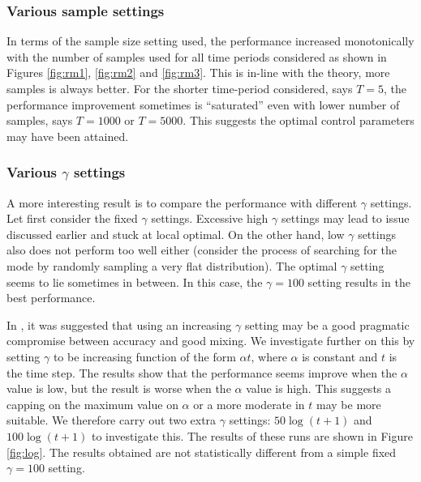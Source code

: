 \subsubsection{Various sample settings}
In terms of the sample size setting used, the performance increased monotonically with the number of samples used for all time periods considered as shown in Figures \ref{fig:rm1}, \ref{fig:rm2} and \ref{fig:rm3}. This is in-line with the theory, more samples is always better. For the shorter time-period considered, says $T=5$, the performance improvement sometimes is ``saturated'' even with lower number of samples, says $T=1000$ or $T=5000$. This suggests the optimal control parameters may have been attained.

 \subsubsection{Various $\gamma$ settings}
A more interesting result is to compare the performance with different $\gamma$ settings. Let first consider the fixed $\gamma$ settings. Excessive high $\gamma$ settings may lead to issue discussed earlier and stuck at local optimal. On the other hand, low $\gamma$ settings also does not perform too well either (consider the process of searching for the mode by randomly sampling a very flat distribution). The optimal $\gamma$ setting seems to lie sometimes in between. In this case, the $\gamma=100$ setting results in the best performance.

In \cite{NK11}, it was suggested that using an increasing $\gamma$ setting may be a good pragmatic compromise between accuracy and good mixing. We investigate further on this by setting $\gamma$ to be increasing function of the form $\alpha t$, where $\alpha$ is constant and $t$ is the time step. The results show that the performance seems improve when the $\alpha$ value is low, but the result is worse when the $\alpha$ value is high. This suggests a capping on the maximum value on $\alpha$ or a more moderate in $t$ may be more suitable. We therefore carry out two extra $\gamma$ settings: $50\log(t+1)$ and $100\log(t+1)$ to investigate this. The results of these runs are shown in Figure \ref{fig:log}. The results obtained are not statistically different from a simple fixed $\gamma=100$ setting.

